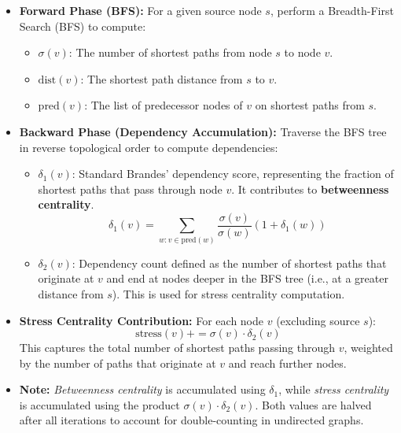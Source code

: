 \documentclass[12pt]{article}
\begin{document}
\begin{itemize}
	\item \textbf{Forward Phase (BFS):}
	      For a given source node \( s \), perform a Breadth-First Search (BFS) to compute:
	      \begin{itemize}
		      \item \( \sigma(v) \): The number of shortest paths from node \( s \) to node \( v \).
		      \item \( \text{dist}(v) \): The shortest path distance from \( s \) to \( v \).
		      \item \( \text{pred}(v) \): The list of predecessor nodes of \( v \) on shortest paths from \( s \).
	      \end{itemize}

	\item \textbf{Backward Phase (Dependency Accumulation):}
	      Traverse the BFS tree in reverse topological order to compute dependencies:
	      \begin{itemize}
		      \item \( \delta_1(v) \): Standard Brandes' dependency score, representing the fraction of shortest paths that pass through node \( v \). It contributes to \textbf{betweenness centrality}.
		            \[
			            \delta_1(v) = \sum_{w : v \in \text{pred}(w)} \frac{\sigma(v)}{\sigma(w)} (1 + \delta_1(w))
		            \]

		      \item \( \delta_2(v) \): Dependency count defined as the number of
		            shortest paths that originate at \( v \) and end at nodes deeper in
		            the BFS tree (i.e., at a greater distance from \( s \)). This is
		            used for stress centrality computation.
	      \end{itemize}

	\item \textbf{Stress Centrality Contribution:}
	      For each node \( v \) (excluding source \( s \)):
	      \[
		      \text{stress}(v) += \sigma(v) \cdot \delta_2(v)
	      \]
	      This captures the total number of shortest paths passing through \( v \), weighted by the number of paths that originate at \( v \) and reach further nodes.

	\item \textbf{Note:}
	      \textit{Betweenness centrality} is accumulated using \( \delta_1 \),
	      while \textit{stress centrality} is accumulated using the product \(
	      \sigma(v) \cdot \delta_2(v) \). Both values are halved after all
	      iterations to account for double-counting in undirected graphs.


\end{itemize}
\end{document}
